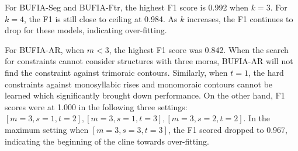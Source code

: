 For BUFIA-Seg and BUFIA-Ftr, the highest F1 score is 0.992 when \(k=3\).
For \(k=4\), the F1 is still close to ceiling at 0.984.
As \(k\) increases, the F1 continues to drop for these models,
indicating over-fitting.

For BUFIA-AR, when \(m<3\), the highest F1 score was 0.842.
When the search for constraints cannot consider structures with three moras,
BUFIA-AR will not find the constraint against trimoraic contours.
Similarly, when \(t=1\), the hard constraints against monosyllabic rises
and monomoraic contours cannot be learned which significantly brought down
performance.
On the other hand, F1 scores were at 1.000 in the following three settings:
\([m=3, s=1, t=2], [m=3, s=1, t=3], [m=3, s=2, t=2]\).
In the maximum setting when \([m=3, s=3, t=3]\), the F1 scored dropped to 0.967,
indicating the beginning of the cline towards over-fitting.


